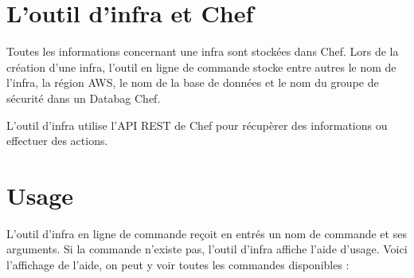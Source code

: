 \section{L'outil d'infra et Chef}

Toutes les informations concernant une infra sont stockées dans Chef.
Lors de la création d'une infra, l'outil en ligne de commande stocke entre
autres le nom de l'infra, la région AWS, le nom de la base de données et le nom
du groupe de sécurité dans un Databag Chef.

L'outil d'infra utilise l'API REST de Chef pour récupèrer des informations ou
effectuer des actions. 

\section{Usage}

L'outil d'infra en ligne de commande reçoit en entrés un nom de commande
et ses arguments. Si la commande n'existe pas, l'outil d'infra affiche l'aide
d'usage.
Voici l'affichage de l'aide, on peut y voir toutes les commandes disponibles :

